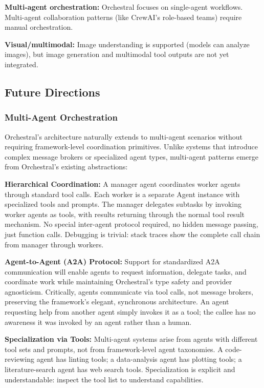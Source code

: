 \documentclass{article}
\begin{document}
\textbf{Multi-agent orchestration:} Orchestral focuses on single-agent workflows. Multi-agent collaboration patterns (like CrewAI's role-based teams) require manual orchestration.

\textbf{Visual/multimodal:} Image understanding is supported (models can analyze images), but image generation and multimodal tool outputs are not yet integrated.

\subsection{Future Directions}

\subsubsection{Multi-Agent Orchestration}

Orchestral's architecture naturally extends to multi-agent scenarios without requiring framework-level coordination primitives. Unlike systems that introduce complex message brokers or specialized agent types, multi-agent patterns emerge from Orchestral's existing abstractions:

\textbf{Hierarchical Coordination:} A manager agent coordinates worker agents through standard tool calls. Each worker is a separate Agent instance with specialized tools and prompts. The manager delegates subtasks by invoking worker agents as tools, with results returning through the normal tool result mechanism. No special inter-agent protocol required, no hidden message passing, just function calls. Debugging is trivial: stack traces show the complete call chain from manager through workers.

\textbf{Agent-to-Agent (A2A) Protocol:} Support for standardized A2A communication will enable agents to request information, delegate tasks, and coordinate work while maintaining Orchestral's type safety and provider agnosticism. Critically, agents communicate via tool calls, not message brokers, preserving the framework's elegant, synchronous architecture. An agent requesting help from another agent simply invokes it as a tool; the callee has no awareness it was invoked by an agent rather than a human.

\textbf{Specialization via Tools:} Multi-agent systems arise from agents with different tool sets and prompts, not from framework-level agent taxonomies. A code-reviewing agent has linting tools; a data-analysis agent has plotting tools; a literature-search agent has web search tools. Specialization is explicit and understandable: inspect the tool list to understand capabilities.
\end{document}
